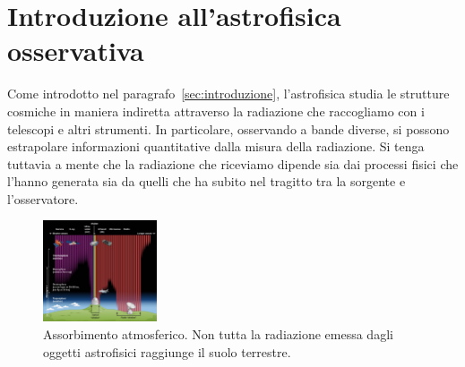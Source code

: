 \section{Introduzione all'astrofisica osservativa}\label{sec:astrofisica-osservativa}
Come introdotto nel paragrafo~\ref{sec:introduzione}, l'astrofisica studia le strutture cosmiche in maniera indiretta attraverso la radiazione che raccogliamo con i telescopi e altri strumenti. In particolare, osservando a bande diverse, si possono estrapolare informazioni quantitative dalla misura della radiazione. Si tenga tuttavia a mente che la radiazione che riceviamo dipende sia dai processi fisici che l'hanno generata sia da quelli che ha subito nel tragitto tra la sorgente e l'osservatore.

\begin{figure}
    \centering
    \includegraphics[width=0.3\textwidth]{immagini/assorbimento-atmosferico.png}
    \caption{Assorbimento atmosferico. Non tutta la radiazione emessa dagli oggetti astrofisici raggiunge il suolo terrestre.}
    \label{fig:assorbimento-atmosferico}
\end{figure}

